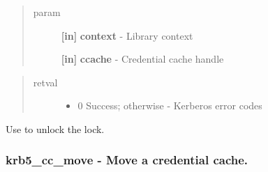 \documentclass[letterpaper,10pt,english]{sphinxmanual}
\begin{document}
\begin{fulllineitems}
\label{appdev/refs/api/krb5_cc_lock:c.krb5_cc_lock}
\end{fulllineitems}

\begin{quote}\begin{description}
\item[{param}] \leavevmode
\textbf{{[}in{]}} \textbf{context} - Library context

\textbf{{[}in{]}} \textbf{ccache} - Credential cache handle

\end{description}\end{quote}
\begin{quote}\begin{description}
\item[{retval}] \leavevmode\begin{itemize}
\item {} 
0   Success; otherwise - Kerberos error codes

\end{itemize}

\end{description}\end{quote}

Use {\hyperref[appdev/refs/api/krb5_cc_unlock:c.krb5_cc_unlock]{}} to unlock the lock.


\subsubsection{krb5\_cc\_move -  Move a credential cache.}
\label{appdev/refs/api/krb5_cc_move:krb5-cc-move-move-a-credential-cache}\label{appdev/refs/api/krb5_cc_move::doc}

\begin{fulllineitems}
\label{appdev/refs/api/krb5_cc_move:c.krb5_cc_move}
\end{fulllineitems}
\end{document}
